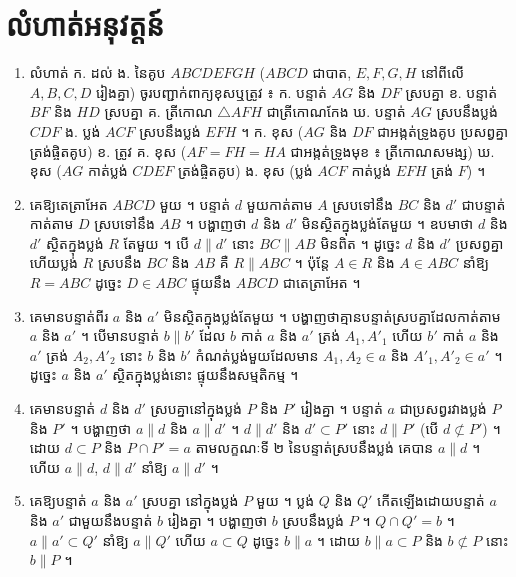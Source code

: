 \section*{លំហាត់អនុវត្តន៍}
\begin{enumerate}[1]
  \item លំហាត់ ក. ដល់ ង. នៃគូប $ABCDEFGH$ ($ABCD$ ជាបាត, $E, F, G, H$ នៅពីលើ $A, B, C, D$ រៀងគ្នា) ចូរបញ្ជាក់ពាក្យខុសឬត្រូវ ៖ \quad ក. បន្ទាត់ $AG$ និង $DF$ ស្របគ្នា \quad ខ. បន្ទាត់ $BF$ និង $HD$ ស្របគ្នា \quad គ. ត្រីកោណ $\triangle AFH$ ជាត្រីកោណកែង \quad ឃ. បន្ទាត់ $AG$ ស្របនឹងប្លង់ $CDF$ \quad ង. ប្លង់ $ACF$ ស្របនឹងប្លង់ $EFH$ ។
  \ans
  ក. ខុស ($AG$ និង $DF$ ជាអង្កត់ទ្រូងគូប ប្រសព្វគ្នាត្រង់ផ្ចិតគូប) \quad ខ. ត្រូវ \quad គ. ខុស ($AF = FH = HA$ ជាអង្កត់ទ្រូងមុខ ៖ ត្រីកោណសមង្ស) \quad ឃ. ខុស ($AG$ កាត់ប្លង់ $CDEF$ ត្រង់ផ្ចិតគូប) \quad ង. ខុស (ប្លង់ $ACF$ កាត់ប្លង់ $EFH$ ត្រង់ $F$) ។
  \item គេឱ្យតេត្រាអែត $ABCD$ មួយ ។ បន្ទាត់ $d$ មួយកាត់តាម $A$ ស្របទៅនឹង $BC$ និង $d'$ ជាបន្ទាត់កាត់តាម $D$ ស្របទៅនឹង $AB$ ។ បង្ហាញថា $d$ និង $d'$ មិនស្ថិតក្នុងប្លង់តែមួយ ។
  \ans
  ឧបមាថា $d$ និង $d'$ ស្ថិតក្នុងប្លង់ $R$ តែមួយ ។ បើ $d \parallel d'$ នោះ $BC \parallel AB$ មិនពិត ។ ដូច្នេះ $d$ និង $d'$ ប្រសព្វគ្នា ហើយប្លង់ $R$ ស្របនឹង $BC$ និង $AB$ គឺ $R \parallel ABC$ ។ ប៉ុន្តែ $A \in R$ និង $A \in ABC$ នាំឱ្យ $R = ABC$ ដូច្នេះ $D \in ABC$ ផ្ទុយនឹង $ABCD$ ជាតេត្រាអែត ។
  \item គេមានបន្ទាត់ពីរ $a$ និង $a'$ មិនស្ថិតក្នុងប្លង់តែមួយ ។ បង្ហាញថាគ្មានបន្ទាត់ស្របគ្នាដែលកាត់តាម $a$ និង $a'$ ។
  \ans
  បើមានបន្ទាត់ $b \parallel b'$ ដែល $b$ កាត់ $a$ និង $a'$ ត្រង់ $A_1, A'_1$ ហើយ $b'$ កាត់ $a$ និង $a'$ ត្រង់ $A_2, A'_2$ នោះ $b$ និង $b'$ កំណត់ប្លង់មួយដែលមាន $A_1, A_2 \in a$ និង $A'_1, A'_2 \in a'$ ។ ដូច្នេះ $a$ និង $a'$ ស្ថិតក្នុងប្លង់នោះ ផ្ទុយនឹងសម្មតិកម្ម ។
  \item គេមានបន្ទាត់ $d$ និង $d'$ ស្របគ្នានៅក្នុងប្លង់ $P$ និង $P'$ រៀងគ្នា ។ បន្ទាត់ $a$ ជាប្រសព្វរវាងប្លង់ $P$ និង $P'$ ។ បង្ហាញថា $a \parallel d$ និង $a \parallel d'$ ។
  \ans
  $d \parallel d'$ និង $d' \subset P'$ នោះ $d \parallel P'$ (បើ $d \not\subset P'$) ។ ដោយ $d \subset P$ និង $P \cap P' = a$ តាមលក្ខណៈទី ២ នៃបន្ទាត់ស្របនឹងប្លង់ គេបាន $a \parallel d$ ។ ហើយ $a \parallel d$, $d \parallel d'$ នាំឱ្យ $a \parallel d'$ ។
  \item គេឱ្យបន្ទាត់ $a$ និង $a'$ ស្របគ្នា នៅក្នុងប្លង់ $P$ មួយ ។ ប្លង់ $Q$ និង $Q'$ កើតឡើងដោយបន្ទាត់ $a$ និង $a'$ ជាមួយនឹងបន្ទាត់ $b$ រៀងគ្នា ។ បង្ហាញថា $b$ ស្របនឹងប្លង់ $P$ ។
  \ans
  $Q \cap Q' = b$ ។ $a \parallel a' \subset Q'$ នាំឱ្យ $a \parallel Q'$ ហើយ $a \subset Q$ ដូច្នេះ $b \parallel a$ ។ ដោយ $b \parallel a \subset P$ និង $b \not\subset P$ នោះ $b \parallel P$ ។

\end{enumerate}
